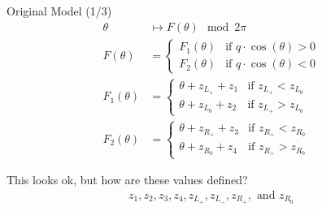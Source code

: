 \begin{frame}{Original Model (1/3)}
	\vspace{-2.0em}
	\begin{align}
		\theta      & \mapsto  F(\theta) \mod 2 \pi
		\\
		F(\theta)   & = \begin{cases}
			                F_1(\theta) & \text{if } q \cdot \cos(\theta) > 0 \\
			                F_2(\theta) & \text{if } q \cdot \cos(\theta) < 0
		                \end{cases}
		\\
		F_1(\theta) & = \begin{cases}
			                \theta + z_{L_+} + z_1 & \text{if } z_{L_+} < z_{L_0} \\
			                \theta + z_{L_0} + z_2 & \text{if } z_{L_+} > z_{L_0}
		                \end{cases}
		\\
		F_2(\theta) & = \begin{cases}
			                \theta + z_{R_+} + z_3 & \text{if } z_{R_+} < z_{R_0} \\
			                \theta + z_{R_0} + z_4 & \text{if } z_{R_+} > z_{R_0}
		                \end{cases}
	\end{align}

	\pause
	\vspace{2em}
	This looks ok, but how are these values defined?
	\begin{align*}
		z_1, z_2, z_3, z_4, z_{L_+}, z_{L_-}, z_{R_+}, \text{ and } z_{R_0}
	\end{align*}
\end{frame}

